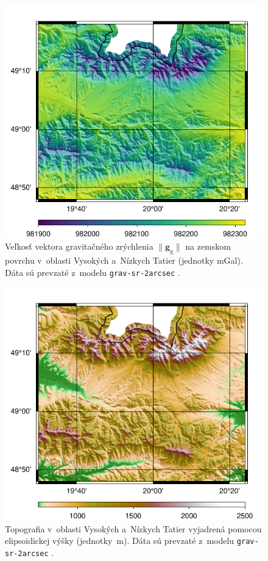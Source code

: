 \documentclass[a4paper,12pt]{book}
\newcommand{\gidx}{\mathrm g}
\let\vec\mathbf
\begin{document}
\begin{figure}
\centering
\includegraphics{./fig-gg-grav-sr-2arcsec.pdf}
\caption{Veľkosť vektora gravitačného zrýchlenia $\| \vec g_\gidx \|$ na 
zemskom povrchu v~oblasti Vysokých a~Nízkych Tatier (jednotky mGal).  Dáta sú 
prevzaté z~modelu \texttt{grav-sr-2arcsec} \parencite{GravSR2arcsec}.}
\label{fig:gg_grav_sr_2arcsec}
\end{figure}

\begin{figure}
\centering
\includegraphics{./fig-h-grav-sr-2arcsec.pdf}
\caption{Topografia v~oblasti Vysokých a~Nízkych Tatier vyjadrená pomocou 
elipsoidickej výšky (jednotky~m).  Dáta sú prevzaté z~modelu 
\texttt{grav-sr-2arcsec} \parencite{GravSR2arcsec}.}
\label{fig:h_grav_sr_2arcsec}
\end{figure}
\end{document}
